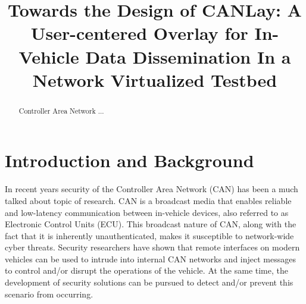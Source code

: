 \documentclass[letterpaper,twocolumn,12pt]{article}
\begin{document}

\date{}

\title{\Large \bf Towards the Design of CANLay: A User-centered Overlay for In-Vehicle Data Dissemination In a Network Virtualized Testbed}


\maketitle

\begin{abstract}
Controller Area Network ...
\end{abstract}

\section{Introduction and Background}
In recent years security of the Controller Area Network (CAN) has been a much talked about topic of research. CAN is a broadcast media that enables reliable and low-latency communication between in-vehicle devices, also referred to as Electronic Control Units (ECU). This broadcast nature of CAN, along with the fact that it is inherently unauthenticated, makes it susceptible to network-wide cyber threats. 
Security researchers have shown \cite{checkoway_comprehensive_2011, mukherjee_practical_2016,burakova_truck_2016} that remote interfaces on modern vehicles can be used to intrude into internal CAN networks and inject messages to control and/or disrupt the operations of the vehicle. At the same time, the development of security solutions can be pursued to detect and/or prevent this scenario from occurring.
\end{document}
